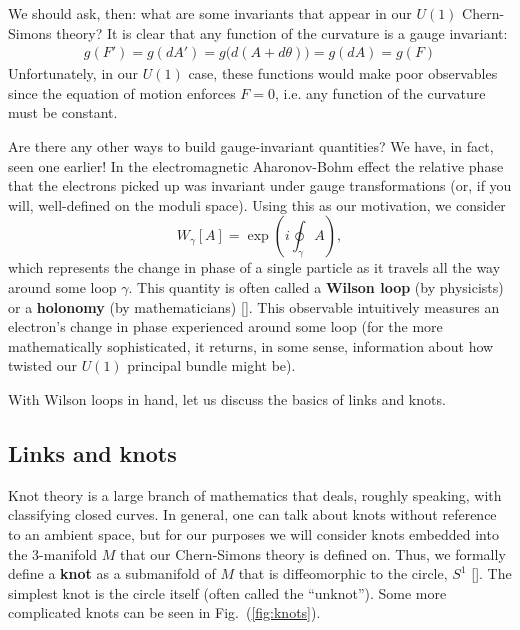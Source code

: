 \documentclass[12pt]{article}
\begin{document}
We should ask, then: what are some invariants that appear in our $U(1)$ Chern-Simons theory? It is clear that any function of the curvature is a gauge invariant:
\begin{align*}
g(F')=g(dA')=g\big(d(A+d\theta)\big)=g(dA)=g(F)
\end{align*}
Unfortunately, in our $U(1)$ case, these functions would make poor observables since the equation of motion enforces $F=0$, i.e. any function of the curvature must be constant.

Are there any other ways to build gauge-invariant quantities? We have, in fact, seen one earlier! In the electromagnetic Aharonov-Bohm effect the relative phase that the electrons picked up was invariant under gauge transformations (or, if you will, well-defined on the moduli space). Using this as our motivation, we consider
\[W_{\gamma}[A]=\exp\left(i\oint_{\gamma} A\right),\]
which represents the change in phase of a single particle as it travels all the way around some loop $\gamma$. This quantity is often called a \textbf{Wilson loop} (by physicists) or a \textbf{holonomy} (by mathematicians) [\cite{baez}]. This observable intuitively measures an electron's change in phase experienced around some loop (for the more mathematically sophisticated, it returns, in some sense, information about how twisted our $U(1)$ principal bundle might be).

With Wilson loops in hand, let us discuss the basics of links and knots. 

\subsection*{Links and knots}
Knot theory is a large branch of mathematics that deals, roughly speaking, with classifying closed curves. In general, one can talk about knots without reference to an ambient space, but for our purposes we will consider knots embedded into the 3-manifold $M$ that our Chern-Simons theory is defined on. Thus, we formally define a \textbf{knot} as a submanifold of $M$ that is diffeomorphic to the circle, $S^1$ [\cite{baez}]. The simplest knot is the circle itself (often called the ``unknot''). Some more complicated knots can be seen in Fig.~(\ref{fig:knots}).
\end{document}
